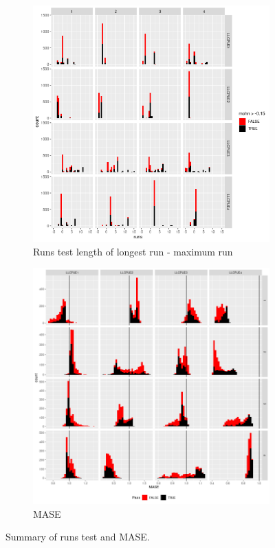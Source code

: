 \begin{figure}
        \begin{subfigure}[b]{0.5\textwidth}
           \includegraphics[width=\linewidth]{figures/runs.length-1.png}
                \caption{Runs test length of longest run - maximum run}
                \label{fig:runs}
                \end{subfigure}%
                \begin{subfigure}[b]{0.5\textwidth} \includegraphics[width=\linewidth]{figures/mase-1.png}
                \caption{MASE}
                \label{fig:mase}
        \end{subfigure}%
        \caption{Summary of runs test and MASE.}\label{fig:mase}
\end{figure}



